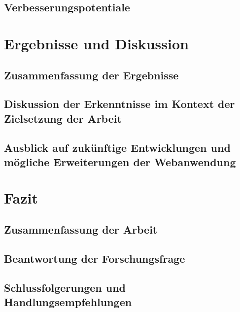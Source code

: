 \documentclass[fontsize=12pt,openright,oneside,paper=a4,BCOR=1cm]{scrbook}
\begin{document}
\section{Verbesserungspotentiale}

%
%

\renewcommand{\cleardoublepage}{}
\chapter{Ergebnisse und Diskussion}

\section{Zusammenfassung der Ergebnisse}

\section{Diskussion der Erkenntnisse im Kontext der Zielsetzung der Arbeit}

\section{Ausblick auf zukünftige Entwicklungen und mögliche Erweiterungen der Webanwendung}

%
%

\renewcommand{\cleardoublepage}{}
\chapter{Fazit}

\section{Zusammenfassung der Arbeit}

\section{Beantwortung der Forschungsfrage}

\section{Schlussfolgerungen und Handlungsempfehlungen}

%
%
\end{document}
